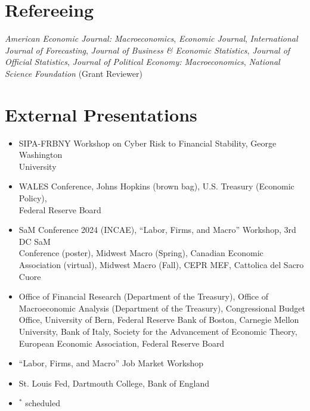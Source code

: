 \documentclass[margin,line]{res}                          %
\newenvironment{list1}{
	\begin{list}{\ding{113}}{%
			\setlength{\itemsep}{0in}
			\setlength{\parsep}{0in} \setlength{\parskip}{0in}
			\setlength{\topsep}{0in} \setlength{\partopsep}{0in}
			\setlength{\leftmargin}{0.17in}}}{\end{list}}
\begin{document}
\begin{resume}
	\section{\sc Refereeing}
	\begin{list1}
		\item[] \emph{American Economic Journal: Macroeconomics}, \emph{Economic Journal}, \emph{International Journal of Forecasting}, \emph{Journal of Business \& Economic Statistics}, \emph{Journal of Official Statistics}, \emph{Journal of Political Economy: Macroeconomics}, \emph{National Science Foundation} (Grant Reviewer) \smallskip
	\end{list1}
	
	\section{\sc External Presentations}
	\begin{list1}
		\item[]
		\begin{itemize}\setlength{\itemindent}{.3cm}
			\item[2026:]\makebox[0.1cm]{\hfill} SIPA-FRBNY Workshop on Cyber Risk to Financial Stability, George Washington\\
			\hspace*{0.55cm}University\smallskip
			\item[2025:]\makebox[0.1cm]{\hfill} WALES Conference, Johns Hopkins (brown bag), U.S. Treasury (Economic Policy),\\ 
			\hspace*{0.55cm}Federal Reserve Board \smallskip
			\item[2024:]\makebox[0.1cm]{\hfill} SaM Conference 2024 (INCAE), ``Labor, Firms, and Macro'' Workshop, 3rd DC SaM\\ 
			\hspace*{0.55cm}Conference (poster), Midwest Macro (Spring), Canadian Economic Association (virtual),
			\hspace*{0.55cm}Midwest Macro (Fall), CEPR MEF, Cattolica del Sacro Cuore\smallskip
			\item[2023:]\makebox[0.1cm]{\hfill} Office of Financial Research (Department of the Treasury), Office of Macroeconomic \hspace*{0.55cm}Analysis (Department of the Treasury), Congressional Budget Office, University of Bern, \hspace*{0.55cm}Federal Reserve Bank of Boston, Carnegie Mellon University, Bank of Italy,  Society \hspace*{0.55cm}for the Advancement of Economic Theory, European Economic Association, Federal
			\hspace*{0.55cm}Reserve Board\smallskip
			\item[2022:]\makebox[0.1cm]{\hfill} ``Labor, Firms, and Macro'' Job Market Workshop \smallskip
			\item[2021:]\makebox[0.1cm]{\hfill} St. Louis Fed, Dartmouth College, Bank of England\\
			\item[]\makebox[-1cm]{\hfill} $^\ast$ scheduled
		\end{itemize}		
	\end{list1}
	

\end{resume}
\end{document}
